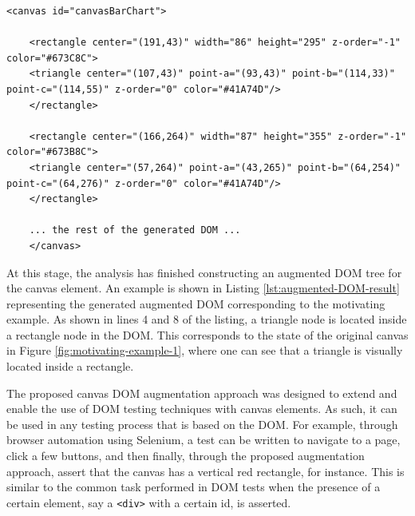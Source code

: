 
\begin{lstlisting}[language=HTML5,float=*,caption={The visually inferred augmented DOM for the canvas element of the motivating example (Figure \ref{fig:motivating-example-1} and Listing \ref{lst:motivating-example-1})}, label={lst:augmented-DOM-result}]
	<canvas id="canvasBarChart">
	
	<rectangle center="(191,43)" width="86" height="295" z-order="-1" color="#673C8C">
	<triangle center="(107,43)" point-a="(93,43)" point-b="(114,33)" point-c="(114,55)" z-order="0" color="#41A74D"/>
	</rectangle>
	
	<rectangle center="(166,264)" width="87" height="355" z-order="-1" color="#673B8C">
	<triangle center="(57,264)" point-a="(43,265)" point-b="(64,254)" point-c="(64,276)" z-order="0" color="#41A74D"/>
	</rectangle>
	
	... the rest of the generated DOM ...
	</canvas>
\end{lstlisting}

At this stage, the analysis has finished constructing an augmented DOM tree for the canvas element. An example is shown in Listing \ref{lst:augmented-DOM-result} representing the generated augmented DOM corresponding to the motivating example. As shown in lines 4 and 8 of the listing, a triangle node is located inside a rectangle node in the DOM. This corresponds to the state of the original canvas in Figure \ref{fig:motivating-example-1}, where one can see that a triangle is visually located inside a rectangle.


The proposed canvas DOM augmentation approach was designed to extend and enable the use of DOM testing techniques with canvas elements. As such, it can be used in any testing process that is based on the DOM. For example, through browser automation using Selenium, a test can be written to navigate to a page, click a few buttons, and then finally, through the proposed augmentation approach, assert that the canvas has a vertical red rectangle, for instance. This is similar to the common task performed in DOM tests when the presence of a certain element, say a \verb|<div>| with a certain id, is asserted. 

